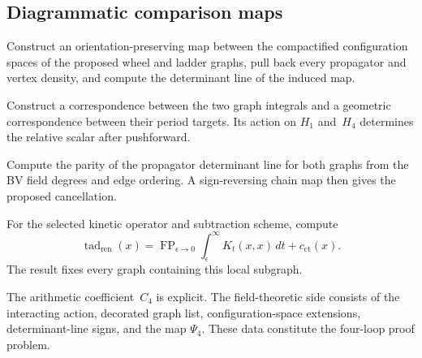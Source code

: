 \subsection{Diagrammatic comparison maps}
\label{subsec:bvbrst-4loop-moves}

\begin{problem}
\label{prop:bvbrst-4loop-pair-a}
Construct an orientation-preserving map between the compactified
configuration spaces of the proposed wheel and ladder graphs, pull
back every propagator and vertex density, and compute the determinant
line of the induced map.
\end{problem}

\begin{problem}
\label{prop:bvbrst-4loop-pair-b}
Construct a correspondence between the two graph integrals and a
geometric correspondence between their period targets.  Its action on
$H_1$ and~$H_4$ determines the relative scalar after pushforward.
\end{problem}

\begin{problem}
\label{prop:bvbrst-4loop-pair-c}
Compute the parity of the propagator determinant line for both graphs
from the BV field degrees and edge ordering.  A sign-reversing chain
map then gives the proposed cancellation.
\end{problem}

\begin{problem}
\label{prop:bvbrst-4loop-tadpole-vanish}
For the selected kinetic operator and subtraction scheme, compute
\begin{equation}\label{eq:bvbrst-4loop-tadpole-reg}
 \operatorname{tad}_{\mathrm{ren}}(x)=
 \operatorname{FP}_{\epsilon\to0}
 \int_\epsilon^\infty K_t(x,x)\,dt+c_{\mathrm{ct}}(x).
\end{equation}
The result fixes every graph containing this local subgraph.
\end{problem}

\begin{remark}
\label{rem:bvbrst-4loop-summary}
The arithmetic coefficient~$C_4$ is explicit.  The field-theoretic
side consists of the interacting action, decorated graph list,
configuration-space extensions, determinant-line signs, and the map
$\Psi_4$.  These data constitute the four-loop proof problem.
\end{remark}

